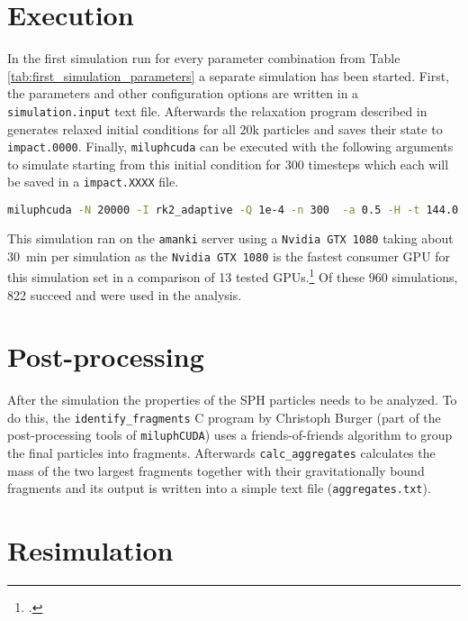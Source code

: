 \section{Execution}

In the first simulation run for every parameter combination from Table \ref{tab:first_simulation_parameters} a separate simulation has been started. First, the parameters and other configuration options are written in a \mbox{\texttt{simulation.input}} text file. Afterwards the relaxation program described in \cite[24\psqq]{Burger2018} generates relaxed initial conditions for all 20k particles and saves their state to \texttt{impact.0000}. Finally, \texttt{miluphcuda} can be executed with the following arguments to simulate starting from this initial condition for 300 timesteps which each will be saved in a \texttt{impact.XXXX} file.

\begin{lstlisting}[language=bash,flexiblecolumns=false]
miluphcuda -N 20000 -I rk2_adaptive -Q 1e-4 -n 300  -a 0.5 -H -t 144.0 -f impact.0000 -m material.cfg -s -g
\end{lstlisting}

This simulation ran on the \texttt{amanki} server using a \texttt{Nvidia GTX 1080} taking about \SI{30}{\minute} per simulation as the \texttt{Nvidia GTX 1080} is the fastest consumer GPU for this simulation set in a comparison of 13 tested GPUs.\footcite{Dorninger} Of these 960 simulations, 822 succeed and were used in the analysis.


\section{Post-processing}
\label{sec:postprocessing}

After the simulation the properties of the SPH particles needs to be analyzed. To do this, the \texttt{identify\_fragments} C program by Christoph Burger (part of the post-processing tools of \texttt{miluphCUDA}) uses a friends-of-friends algorithm to group the final particles into fragments. Afterwards \texttt{calc\_aggregates} calculates the mass of the two largest fragments together with their gravitationally bound fragments and its output is written into a simple text file (\texttt{aggregates.txt}).


\section{Resimulation}
\label{sec:resimulation}

